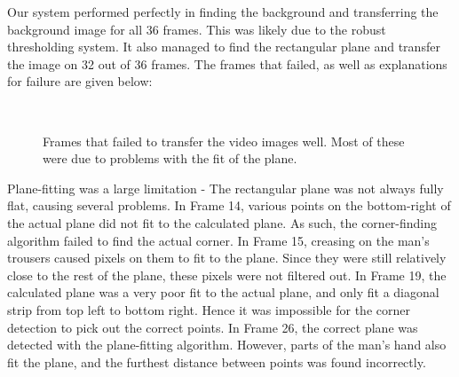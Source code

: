 \documentclass[11pt]{article}
\begin{document}
Our system performed perfectly in finding the background and transferring the background image for all 36 frames. This was likely due to the robust thresholding system. It also managed to find the rectangular plane and transfer the image on 32 out of 36 frames. The frames that failed, as well as explanations for failure are given below: 

\begin{figure}[h]
  \centering
   ~
   ~
   ~
   ~
  \caption{Frames that failed to transfer the video images well. Most of these were due to problems with the fit of the plane.}
  \label{fig:failvid}
\end{figure}

Plane-fitting was a large limitation - The rectangular plane was not always fully flat, causing several problems. In Frame 14, various points on the bottom-right of the actual plane did not fit to the calculated plane. As such, the corner-finding algorithm failed to find the actual corner. In Frame 15, creasing on the man's trousers caused pixels on them to fit to the plane. Since they were still relatively close to the rest of the plane, these pixels were not filtered out. In Frame 19, the calculated plane was a very poor fit to the actual plane, and only fit a diagonal strip from top left to bottom right. Hence it was impossible for the corner detection to pick out the correct points. In Frame 26, the correct plane was detected with the plane-fitting algorithm. However, parts of the man's hand also fit the plane, and the furthest distance between points was found incorrectly. 
\end{document}

